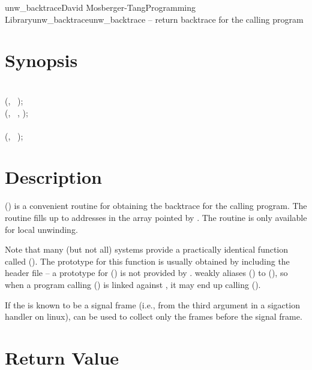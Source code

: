 \documentclass{article}
\begin{document}
\begin{Name}{3}{unw\_backtrace}{David Mosberger-Tang}{Programming Library}{unw\_backtrace}unw\_backtrace -- return backtrace for the calling program
\end{Name}

\section{Synopsis}

\\

 (, ~);\\
 (, ~, );\\

\\

 (, ~);\\

\section{Description}

() is a convenient routine for obtaining the backtrace for
the calling program. The routine fills up to  addresses in the array
pointed by . The routine is only available for local unwinding.

Note that many (but not all) systems provide a practically identical function
called (). The prototype for this function is usually obtained
by including the  header file -- a prototype for
() is not provided by .  weakly
aliases () to (), so when a program
calling () is linked against , it may end up
calling ().

If the  is known to be a signal frame (i.e., from the third argument
in a sigaction handler on linux),  can be used to collect
only the frames before the signal frame.

\section{Return Value}
\end{document}
